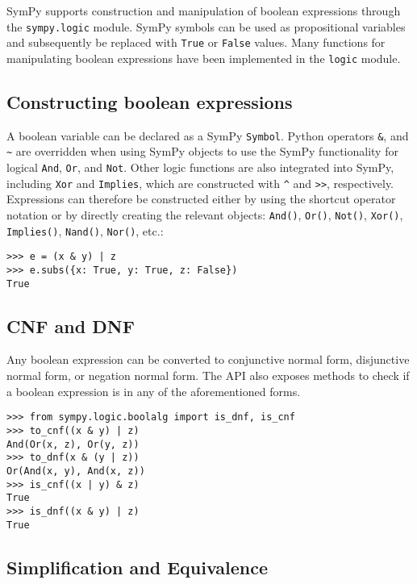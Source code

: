 
SymPy supports construction and manipulation of boolean expressions
through the \texttt{sympy.logic} module. SymPy symbols can be used as
propositional variables and subsequently be replaced with \texttt{True}
or \texttt{False} values. Many functions for manipulating boolean
expressions have been implemented in the \texttt{logic} module.

\subsection{Constructing boolean expressions}

A boolean variable can be declared as a SymPy \verb|Symbol|. Python operators
\texttt{\&}, \texttt{\textbar{}} and \texttt{\textasciitilde{}} are overridden
when using SymPy objects to use the SymPy functionality for logical
\texttt{And}, \texttt{Or}, and \texttt{Not}. Other logic functions are also
integrated into SymPy, including \texttt{Xor} and \texttt{Implies}, which are
constructed with \texttt{\^{}} and \texttt{\textgreater{}\textgreater{}},
respectively. Expressions can therefore be constructed either by using
the shortcut operator notation or by directly creating the relevant
objects: \verb|And()|,
\verb|Or()|, \verb|Not()|, \verb|Xor()|, \verb|Implies()|, \verb|Nand()|,
\verb|Nor()|, etc.:

\begin{verbatim}
>>> e = (x & y) | z
>>> e.subs({x: True, y: True, z: False})
True
\end{verbatim}

\subsection{CNF and DNF}

Any boolean expression can be converted to conjunctive normal form, disjunctive
normal form, or negation normal form. The API also exposes methods to check if
a boolean expression is in any of the aforementioned forms.

\begin{verbatim}
>>> from sympy.logic.boolalg import is_dnf, is_cnf
>>> to_cnf((x & y) | z)
And(Or(x, z), Or(y, z))
>>> to_dnf(x & (y | z))
Or(And(x, y), And(x, z))
>>> is_cnf((x | y) & z)
True
>>> is_dnf((x & y) | z)
True
\end{verbatim}

\subsection{Simplification and Equivalence}

